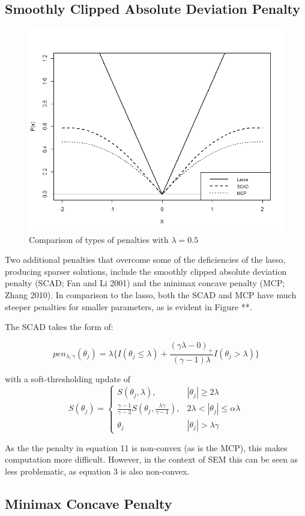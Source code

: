 \documentclass[article]{jss}
\begin{document}
\subsection{Smoothly Clipped Absolute Deviation
Penalty}\label{smoothly-clipped-absolute-deviation-penalty}

\begin{figure}
    \centering
    \includegraphics[width=.5\linewidth]{figs/penalties}
    \caption{Comparison of types of penalties with $\lambda=0.5$}
\end{figure}

Two additional penalties that overcome some of the deficiencies of the
lasso, producing sparser solutions, include the smoothly clipped
absolute deviation penalty (SCAD; Fan and Li 2001) and the minimax
concave penalty (MCP; Zhang 2010). In comparison to the lasso, both the
SCAD and MCP have much steeper penalties for smaller parameters, as is
evident in Figure **.

The SCAD takes the form of:

\[
pen_{\lambda,\gamma}(\theta_{j}) = \lambda \big\{I(\theta_{j}\leq\lambda) + \frac{(\gamma \lambda-0)_{+}}{(\gamma-1)\lambda}I(\theta_{j}>\lambda)\big\}
\]

\noindent
with a soft-thresholding update of \[
S(\theta_{j})= 
\begin{cases}
S(\theta_{j},\lambda),&  |\theta_{j}| \geq 2\lambda\\
\frac{\gamma-1}{\gamma-2}S(\theta_{j},\frac{\lambda\gamma}{\gamma-1}),              & 2\lambda < |\theta_{j}|\leq\alpha\lambda\\
\theta_{j} & |\theta_{j}| > \lambda \gamma
\end{cases}
\]

\noindent
As the the penalty in equation 11 is non-convex (as is the MCP), this
makes computation more difficult. However, in the context of SEM this
can be seen as less problematic, as equation 3 is also non-convex.

\subsection{Minimax Concave Penalty}\label{minimax-concave-penalty}
\end{document}

